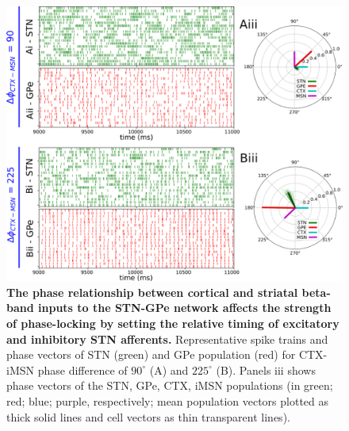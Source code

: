 \begin{figure}
\centering
\includegraphics[width=\textwidth]{ch_detailed_model/figs_split/fig_exogenous_sweep-ctx-msn-phase_B-rasters.png}
\caption{
\textbf{The phase relationship between cortical and striatal beta-band inputs to the STN-GPe network affects the strength of phase-locking by setting the relative timing of excitatory and inhibitory STN afferents.}
Representative spike trains and phase vectors of STN (green) and GPe population (red) for CTX-iMSN phase difference of $90^\circ$ (A) and $225^\circ$ (B). Panels iii shows phase vectors of the STN, GPe, CTX, iMSN populations (in green; red; blue; purple, respectively; mean population vectors plotted as thick solid lines and cell vectors as thin transparent lines).
}
\label{fig:exogenous_sweep-ctx-msn-phase_B-rasters}
\end{figure}

